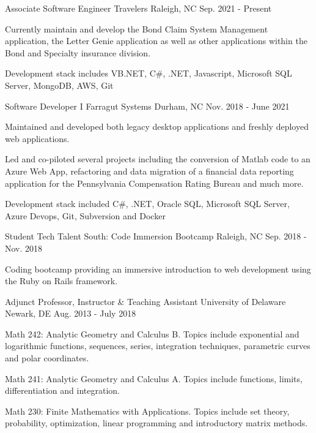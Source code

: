 \begin{cventries}
  \cventry
    {Associate Software Engineer}
    {Travelers}
    {Raleigh, NC}
    {Sep. 2021 - Present}
    {
      \begin{cvitems}
        \item {Currently maintain and develop the Bond Claim System Management application, the Letter Genie application as well as other applications within the Bond and Specialty insurance division.}
        \item {Development stack includes VB.NET, C\#, .NET, Javascript, Microsoft SQL Server, MongoDB, AWS, Git}
      \end{cvitems}
    }
  \cventry
    {Software Developer I}
    {Farragut Systems}
    {Durham, NC}
    {Nov. 2018 - June 2021}
    {
      \begin{cvitems}
        \item {Maintained and developed both legacy desktop applications and freshly deployed web applications.}
        \item {Led and co-piloted several projects including the conversion of Matlab code to an Azure Web App, refactoring and data migration of a financial data reporting application for the Pennsylvania Compensation Rating Bureau and much more.}
        \item {Development stack included C\#, .NET, Oracle SQL, Microsoft SQL Server, Azure Devops, Git, Subversion and Docker}
      \end{cvitems}
    }
  \cventry
    {Student}
    {Tech Talent South: Code Immersion Bootcamp}
    {Raleigh, NC}
    {Sep. 2018 - Nov. 2018}
    {
      \begin{cvitems}
        \item {Coding bootcamp providing an immersive introduction to web development using the Ruby on Rails framework.}
      \end{cvitems}
    }
  \cventry
    {Adjunct Professor, Instructor \& Teaching Assistant}
    {University of Delaware}
    {Newark, DE}
    {Aug. 2013 - July 2018}
    {
      \begin{cvitems}
        \item {Math 242: Analytic Geometry and Calculus B. Topics include exponential and logarithmic functions, sequences, series, integration techniques, parametric curves and polar coordinates.}
        \item {Math 241: Analytic Geometry and Calculus A. Topics include functions, limits, differentiation and integration.}
        \item {Math 230: Finite Mathematics with Applications. Topics include set theory, probability, optimization, linear programming and introductory matrix methods.}

\end{cvitems}}
\end{cventries}
